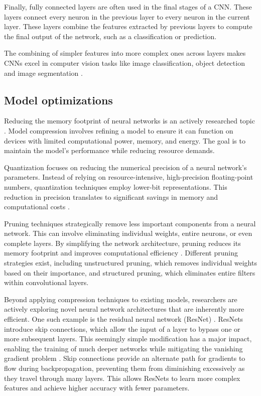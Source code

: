 Finally, fully connected layers are often used in the final stages of a CNN.
These layers connect every neuron in the previous layer to every neuron in the current layer.
These layers combine the features extracted by previous layers to compute the final output of the network, such as a classification or prediction.

The combining of simpler features into more complex ones across layers makes CNNs excel in computer vision tasks like image classification, object detection and image segmentation \cite{krizhevskyImageNetClassificationDeep2017}.

\subsection{Model optimizations}
Reducing the memory footprint of neural networks is an actively researched topic \cite{neillOverviewNeuralNetwork2020, leEfficientNeuralNetworks2023}.
Model compression involves refining a model to ensure it can function on devices with limited computational power, memory, and energy.
The goal is to maintain the model's performance while reducing resource demands.

Quantization focuses on reducing the numerical precision of a neural network's parameters.
Instead of relying on resource-intensive, high-precision floating-point numbers, quantization techniques employ lower-bit representations.
This reduction in precision translates to significant savings in memory and computational costs \autocite{guoSurveyMethodsTheories2018}.

Pruning techniques strategically remove less important components from a neural network.
This can involve eliminating individual weights, entire neurons, or even complete layers.
By simplifying the network architecture, pruning reduces its memory footprint and improves computational efficiency \cite{blalockWhatStateNeural2020}.
Different pruning strategies exist, including unstructured pruning, which removes individual weights based on their importance, and structured pruning, which eliminates entire filters within convolutional layers.

Beyond applying compression techniques to existing models, researchers are actively exploring novel neural network architectures that are inherently more efficient.
One such example is the residual neural network (ResNet) \autocite{heDeepResidualLearning2015}.
ResNets introduce skip connections, which allow the input of a layer to bypass one or more subsequent layers.
This seemingly simple modification has a major impact, enabling the training of much deeper networks while mitigating the vanishing gradient problem \cite{pascanuDifficultyTrainingRecurrent2012}.
Skip connections provide an alternate path for gradients to flow during backpropagation, preventing them from diminishing excessively as they travel through many layers.
This allows ResNets to learn more complex features and achieve higher accuracy with fewer parameters. 
